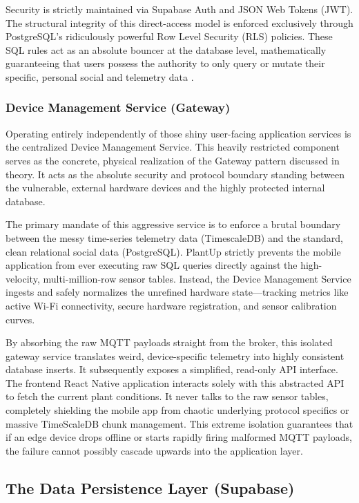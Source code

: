 Security is strictly maintained via Supabase Auth and JSON Web Tokens (JWT). The structural integrity of this direct-access model is enforced exclusively through PostgreSQL's ridiculously powerful Row Level Security (RLS) policies. These SQL rules act as an absolute bouncer at the database level, mathematically guaranteeing that users possess the authority to only query or mutate their specific, personal social and telemetry data \cite{broadwaySupabase, supabaseReactNative, tigerdataRelational}.

\subsubsection{Device Management Service (Gateway)}

Operating entirely independently of those shiny user-facing application services is the centralized Device Management Service. This heavily restricted component serves as the concrete, physical realization of the Gateway pattern discussed in theory. It acts as the absolute security and protocol boundary standing between the vulnerable, external hardware devices and the highly protected internal database.

The primary mandate of this aggressive service is to enforce a brutal boundary between the messy time-series telemetry data (TimescaleDB) and the standard, clean relational social data (PostgreSQL). PlantUp strictly prevents the mobile application from ever executing raw SQL queries directly against the high-velocity, multi-million-row sensor tables. Instead, the Device Management Service ingests and safely normalizes the unrefined hardware state—tracking metrics like active Wi-Fi connectivity, secure hardware registration, and sensor calibration curves.

By absorbing the raw MQTT payloads straight from the broker, this isolated gateway service translates weird, device-specific telemetry into highly consistent database inserts. It subsequently exposes a simplified, read-only API interface. The frontend React Native application interacts solely with this abstracted API to fetch the current plant conditions. It never talks to the raw sensor tables, completely shielding the mobile app from chaotic underlying protocol specifics or massive TimeScaleDB chunk management. This extreme isolation guarantees that if an edge device drops offline or starts rapidly firing malformed MQTT payloads, the failure cannot possibly cascade upwards into the application layer.

\subsection{The Data Persistence Layer (Supabase)}

